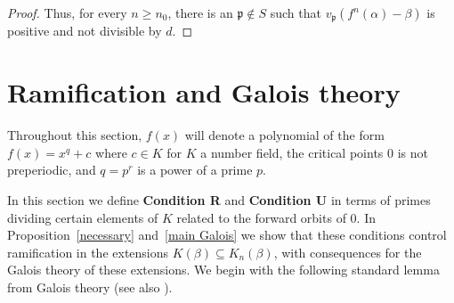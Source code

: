 \documentclass[11pt]{amsart}
\theoremstyle{definition}
\theoremstyle{definition}
\numberwithin{thm}{section}
\numberwithin{equation}{thm}
\newcommand{\fp}{\ensuremath{{\mathfrak{p}}}}
\newcommand{\cS}{\mathcal S}
\newcommand{\Kbar}{\ensuremath {\overline K}}
\begin{document}
\begin{proof}
 Thus, for every $n \geq n_0$, there is an $\fp \notin S$ such that
 $v_\fp(f^n(\alpha) - \beta)$ is positive and not divisible by $d$.  


  

  

      
    


\end{proof}


\section{Ramification and Galois theory}\label{Galois section}
Throughout this section,  $f(x)$ will denote a polynomial of the form
$f(x) = x^q + c$ where $c \in K$ for $K$ a number field, the critical points 0 is not
preperiodic, and $q = p^r$ is a power of a prime $p$.  

In this section we define
{\bf Condition R} and {\bf Condition U} in terms of primes dividing
certain elements of $K$ related to the forward orbits of 0. In
Proposition~\ref{necessary} and~\ref{main Galois} we show that these
conditions control ramification in the extensions
$K(\beta) \subseteq K_n(\beta)$, with consequences for the Galois
theory of these extensions.  We begin with the following standard
lemma from Galois theory (see also \cite[Lemma~6.1]{BT2}).  
\end{document}
